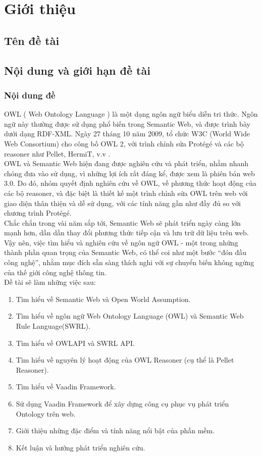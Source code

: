 \chapter {Giới thiệu}
\section{Tên đề tài}

\section{Nội dung và giới hạn đề tài}
\subsection{Nội dung đề}
OWL ( Web Ontology Language ) là một dạng ngôn ngữ biểu diễn tri thức. Ngôn ngữ này thường được sử dụng phổ biến trong Semantic Web, và được trình bày dưới dạng RDF-XML. Ngày 27 tháng 10 năm 2009, tổ chức W3C (World Wide Web Consortium) cho công bố OWL 2, với trình chỉnh sửa Protégé và các bộ reasoner như Pellet, HermiT, v.v .
\\
OWL và Semantic Web hiện đang được nghiên cứu và phát triển, nhằm nhanh chóng đưa vào sử dụng, vì những lợi ích rất đáng kể, được xem là phiên bản web 3.0. Do đó, nhóm quyết định nghiên cứu về OWL, về phương thức hoạt động của các bộ reasoner, và đặc biệt là thiết kế một trình chỉnh sửa OWL trên web với giao diện thân thiện và dễ sử dụng, với các tính năng gần như đầy đủ so với chương trình Protégé. 
\\
Chắc chắn trong vài năm sắp tới, Semantic Web sẽ phát triển ngày càng lớn mạnh hơn, dần dần thay đổi phương thức tiếp cận và lưu trữ dữ liệu trên web. Vậy nên, việc tìm hiểu và nghiên cứu về ngôn ngữ OWL - một trong những thành phần quan trọng của Semantic Web, có thể coi như một bước “đón đầu công nghệ”, nhằm mục đích sẵn sàng thích nghi với sự chuyển biến không ngừng của thế giới công nghệ thông tin.
\\
Đề tài sẽ làm những việc sau:
\begin{enumerate}
\item Tìm hiểu về Semantic Web và Open World Assumption.
\item Tìm hiểu về ngôn ngữ Web Ontology Language (OWL) và Semantic Web Rule Language(SWRL).
\item Tìm hiểu về OWLAPI và SWRL API.
\item Tìm hiểu về nguyên lý hoạt động của OWL Reasoner (cụ thể là Pellet Reasoner).
\item Tìm hiểu về Vaadin Framework.
\item Sử dụng Vaadin Framework để xây dựng công cụ phục vụ phát triển Ontology trên web.
\item Giới thiệu những đặc điểm và tính năng nổi bật của phần mềm.
\item Kết luận và hướng phát triển nghiên cứu.
\end{enumerate}

